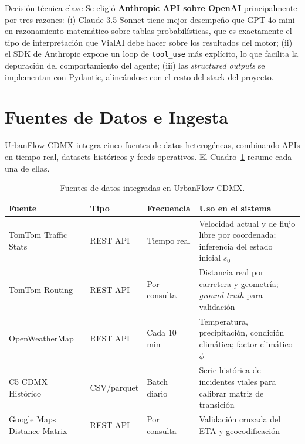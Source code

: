 \documentclass[11pt,a4paper]{article}
\begin{document}
\begin{insightbox}{Decisión técnica clave}
Se eligió \textbf{Anthropic API sobre OpenAI} principalmente por tres razones: (i) Claude 3.5 Sonnet tiene mejor desempeño que GPT-4o-mini en razonamiento matemático sobre tablas probabilísticas, que es exactamente el tipo de interpretación que VialAI debe hacer sobre los resultados del motor; (ii) el SDK de Anthropic expone un loop de \texttt{tool\_use} más explícito, lo que facilita la depuración del comportamiento del agente; (iii) las \textit{structured outputs} se implementan con Pydantic, alineándose con el resto del stack del proyecto.
\end{insightbox}

\section{Fuentes de Datos e Ingesta}

UrbanFlow CDMX integra cinco fuentes de datos heterogéneas, combinando APIs en tiempo real, datasets históricos y feeds operativos. El Cuadro~\ref{tab:fuentes} resume cada una de ellas.

\begin{table}[H]
\centering
\small
\renewcommand{\arraystretch}{1.15}
\begin{tabular}{@{}p{3.5cm}p{3cm}p{2cm}p{5cm}@{}}
\toprule
\textbf{Fuente} & \textbf{Tipo} & \textbf{Frecuencia} & \textbf{Uso en el sistema} \\
\midrule
TomTom Traffic Stats & REST API & Tiempo real & Velocidad actual y de flujo libre por coordenada; inferencia del estado inicial $s_0$ \\
TomTom Routing & REST API & Por consulta & Distancia real por carretera y geometría; \textit{ground truth} para validación \\
OpenWeatherMap & REST API & Cada 10 min & Temperatura, precipitación, condición climática; factor climático $\phi$ \\
C5 CDMX Histórico & CSV/parquet & Batch diario & Serie histórica de incidentes viales para calibrar matriz de transición \\
Google Maps Distance Matrix & REST API & Por consulta & Validación cruzada del ETA y geocodificación \\
\bottomrule
\end{tabular}
\caption{Fuentes de datos integradas en UrbanFlow CDMX.}
\label{tab:fuentes}
\end{table}
\end{document}
